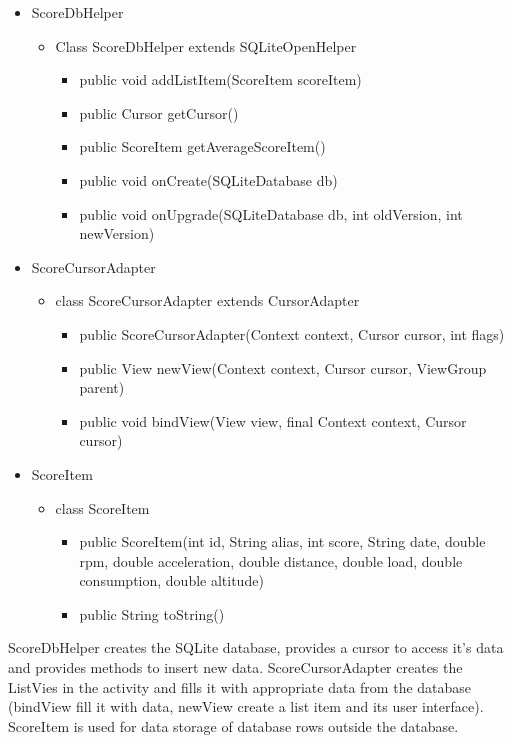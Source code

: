 \documentclass{article}
\begin{document}
\begin{itemize}
\item ScoreDbHelper
\begin{itemize}
\begin{figure}[h!]
\texttt{[image: classActi3.PNG]}
\end{figure}
\item Class ScoreDbHelper extends SQLiteOpenHelper
\begin{itemize}
\item public void addListItem(ScoreItem scoreItem)
\item public Cursor getCursor()
\item public ScoreItem getAverageScoreItem()
\item public void onCreate(SQLiteDatabase db)
\item public void onUpgrade(SQLiteDatabase db, int oldVersion, int newVersion)
\end{itemize}
\end{itemize}
\item ScoreCursorAdapter
\begin{itemize}
\begin{figure}[h!]
\texttt{[image: classActi4.PNG]}
\end{figure}
\item class ScoreCursorAdapter extends CursorAdapter
\begin{itemize}
\item public ScoreCursorAdapter(Context context, Cursor cursor, int flags)
\item public View newView(Context context, Cursor cursor, ViewGroup parent)
\item public void bindView(View view, final Context context, Cursor cursor)
\end{itemize}
\end{itemize}
\item ScoreItem
\begin{itemize}
\begin{figure}[h!]
\texttt{[image: classActi5.PNG]}
\end{figure}
\item class ScoreItem
\begin{itemize}
\item public ScoreItem(int id, String alias, int score, String date, double rpm, double acceleration, double distance, double load, double consumption, double altitude)
\item public String toString()
\end{itemize}
\end{itemize}
\end{itemize}
ScoreDbHelper creates the SQLite database, provides a cursor to access it’s data and provides methods to insert new data. ScoreCursorAdapter creates the ListVies in the activity and fills it with appropriate data from the database (bindView fill it with data, newView create a list item and its user interface). ScoreItem is used for data storage of database rows outside the database.
\end{document}

